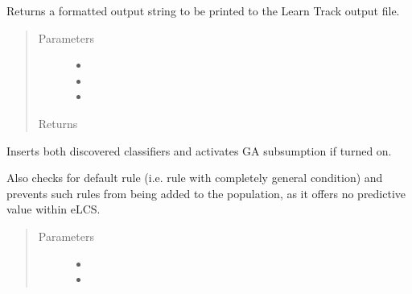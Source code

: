 \documentclass[letterpaper,10pt,english]{sphinxmanual}
\begin{document}
\begin{fulllineitems}
\begin{fulllineitems}
\label{\detokenize{eLCS:eLCS.ClassifierSet.ClassifierSet.getPopTrack}}
Returns a formatted output string to be printed to the Learn Track output file.
\begin{quote}\begin{description}
\item[{Parameters}] \leavevmode\begin{itemize}
\item {} 
 \textendash{} 

\item {} 
 \textendash{} 

\item {} 
 \textendash{} 

\end{itemize}

\item[{Returns}] \leavevmode


\end{description}\end{quote}

\end{fulllineitems}


\begin{fulllineitems}
\label{\detokenize{eLCS:eLCS.ClassifierSet.ClassifierSet.insertDiscoveredClassifiers}}
Inserts both discovered classifiers and activates GA subsumption if turned on.

Also checks for default rule (i.e. rule with completely general condition)
and prevents such rules from being added to the population, as it offers no predictive value within eLCS.
\begin{quote}\begin{description}
\item[{Parameters}] \leavevmode\begin{itemize}
\item {} 
 \textendash{} 

\item {} 
 \textendash{} 


\end{itemize}
\end{description}
\end{quote}
\end{fulllineitems}
\end{fulllineitems}
\end{document}
